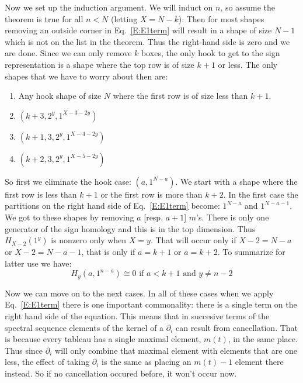 \documentclass{elsart}
\begin{document}
\begin{pf}
  Now we set up the induction argument. We will induct on $n$, so assume the theorem is true for all $n < N$ 
  (letting $X=N-k$). Then for most
  shapes removing an outside corner in Eq.~\ref{E:E1term} will result in a shape of size $N-1$ which is not on the
  list in the theorem. Thus the right-hand side is zero and we are done. Since we can only remove $k$ boxes, the only
  hook to get to the sign representation is a shape where the top row is of size $k+1$ or less. 
  The only shapes that we have to worry about then
  are: 
  \begin{enumerate}
    \item Any hook shape of size $N$ where the first row is of size less than $k+1$.
    \item $(k+3, 2^y, 1^{X-3-2y})$
    \item $(k+1, 3, 2^y, 1^{X-4-2y})$
    \item $(k+2, 3, 2^y, 1^{X-5-2y})$
  \end{enumerate}

  So first we eliminate the hook case: $(a, 1^{N-a})$. 
  We start with a shape where the first row is less than $k+1$ or
  the first row is more than $k+2$. In the first case the partitions on the right hand side of Eq.~\ref{E:E1term} 
   become: $1^{N-a}$ and $1^{N-a-1}$. We got to these shapes
  by removing $a$ [resp. $a+1$] $m$'s. There is only one generator of the sign homology and this is in the top dimension.
  Thus $H_{X-2}(1^y)$ is nonzero only when $X=y$. That will occur only if $X-2 = N-a$ or $X-2 = N-a-1$, that is only if 
  $a= k+1$ or $a=k+2$. To summarize for latter use we have:
  \begin{equation} \label{E:smallhook}
    H_y(a, 1^{n-a}) \cong 0 \mbox{ if $a < k+1$ and $y \ne n-2$}
  \end{equation}

  Now we can move on to the next cases. In all of these cases when we apply Eq.~\ref{E:E1term} there is one 
  important commonality: there is a single term on the right hand side of the equation. This means that in succesive terms
  of the spectral sequence elements of the kernel of a $\partial_i$ can result from cancellation. That is because every 
  tableau has a single maximal element, $m(t)$, in the same place. Thus since $\partial_i$ will only combine that maximal element
  with elements that are one less, the effect of taking $\partial_i$ is the same as placing an $m(t)-1$ element there 
  instead. So if no cancellation occured before, it won't occur now.


\end{pf}
\end{document}
